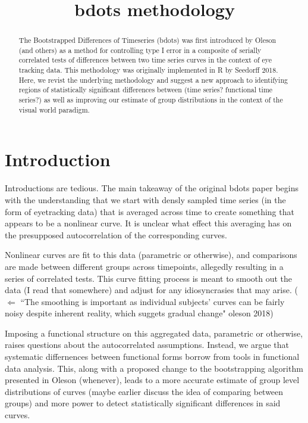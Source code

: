 \documentclass{article}
\title{bdots methodology}
\date{}
\begin{document}

\maketitle

%

\begin{abstract}
The Bootstrapped Differences of Timeseries (bdots) was first introduced by Oleson (and others) as a method for controlling type I error in a composite of serially correlated tests of differences between two time series curves in the context of eye tracking data.  This methodology was originally implemented in R by Seedorff 2018. Here, we revist the underlying methodology and suggest a new approach to identifying regions of statistically significant differences between (time series? functional time series?) as well as improving our estimate of group distributions in the context of the visual world paradigm.
\end{abstract}

\section{Introduction}

Introductions are tedious. The main takeaway of the original bdots paper begins with the understanding that we start with densly sampled time series (in the form of eyetracking data) that is averaged across time to create something that appears to be a nonlinear curve. It is unclear what effect this averaging has on the presupposed autocorrelation of the corresponding curves.

Nonlinear curves are fit to this data (parametric or otherwise), and comparisons are made between different groups across timepoints, allegedly resulting in a series of correlated tests. This curve fitting process is meant to smooth out the data (I read that somewhere) and adjust for any idiosyncrasies that may arise. ($\Leftarrow$ ``The smoothing is important as individual subjects' curves can be fairly noisy despite inherent reality, which suggets gradual change" oleson 2018)

Imposing a functional structure on this aggregated data, parametric or otherwise, raises questions about the autocorrelated assumptions. Instead, we argue that systematic differnences between functional forms borrow from tools in functional data analysis. This, along with a proposed change to the bootstrapping algorithm presented in Oleson (whenever), leads to a more accurate estimate of group level distributions of curves (maybe earlier discuss the idea of comparing between groups) and more power to detect statistically significant differences in said curves.
\end{document}

